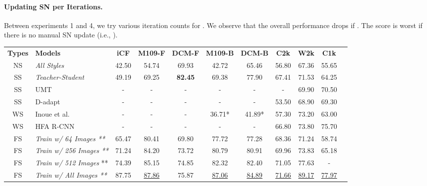 \documentclass{article}
\begin{document}
\paragraph{Updating SN per  Iterations.}{Between experiments 1 and 4, we try various iteration counts for . We observe that the overall performance drops if . The score is worst if there is no manual SN update (i.e., ).}



\begin{table*}
\centering
\begin{tabular}{cl|ccc|cccccc}
    \hline
    \noalign{\smallskip}
    \textbf{Types} & \textbf{Models} & 
    \textbf{iCF} & \textbf{M109-F} & \textbf{DCM-F} & 
    \textbf{M109-B} & \textbf{DCM-B} & \textbf{C2k} & \textbf{W2k} & \textbf{C1k} \\
    \noalign{\smallskip}
    \hline
    \noalign{\smallskip}
    NS & \textit{All Styles} 
    & 42.50 & 54.74 & 69.93 & 42.72 & 65.46 & 56.80 & 67.36 & 55.65  \\
    SS & \textit{Teacher-Student} 
    & 49.19 & 69.25 & \textbf{82.45} & 69.38 & 77.90 & 67.41 & 71.53 & 64.25 \\

    \noalign{\smallskip}
    \hline
    \noalign{\smallskip} 
    SS & UMT \cite{umt_model} & - & - & - & - & - & - & 69.90 & 70.50 \\
    SS & D-adapt \cite{dadapt} & - & - & - & - & - & 53.50 & 68.90 & 69.30 \\
    WS & Inoue et al. \cite{inoue2018crossdomain} 
    & - & - & - & 36.71* & 41.89* & 57.30 & 73.20 & 63.00 \\
    WS & HFA R-CNN \cite{h2farcnn} & - & - & - & - & - & 66.80 & 73.80 & 75.70 \\
    
    \noalign{\smallskip}
    \hline
    \noalign{\smallskip}
    
    FS & \textit{Train w/ 64 Images **} 
    & 65.47 & 80.41 & 69.80  & 77.72 & 77.28  & 68.36 & 71.24 & 58.74  \\

    FS & \textit{Train w/ 256 Images **} 
    &  71.24 & 84.20 & 73.72 & 80.79 & 80.91 & 69.96 & 73.83 & 65.18 \\
    
    FS & \textit{Train w/ 512 Images} **
    & 74.39
    & 85.15
    & 74.85
    & 82.32
    & 82.40
    & 71.05
    & 77.63
    & - \\
    
    FS & \textit{Train w/ All Images **}
    & 87.75
    & \underline{87.86}
    & 75.87
    & \underline{87.06}
    & \underline{84.89}
    & \underline{71.66}
    & \underline{89.17}
    & \underline{77.97}\\


\end{tabular}
\end{table*}
\end{document}
